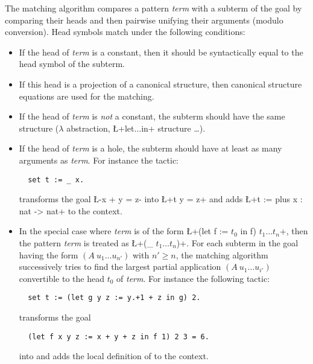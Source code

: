 The matching algorithm compares a pattern \textit{term}
 with a subterm of the goal by comparing their heads
and then pairwise unifying their arguments (modulo conversion). Head
symbols match under the following conditions:

\begin{itemize}
\item If the head of \textit{term} is a constant, then it
  should be syntactically equal to the head symbol of the subterm.
\item If this head is a projection of a canonical structure,
  then canonical structure equations are used for the matching.
\item If the head of \textit{term} is \emph{not} a constant, the
  subterm should have the same structure ($\lambda$ abstraction,
  \L+let$\dots$in+ structure \dots).
\item If the head of \textit{term} is a hole, the subterm should have
  at least as many arguments as  \textit{term}. For instance the tactic:
\begin{lstlisting}
  set t := _ x.
\end{lstlisting}
transforms the goal \L-x + y = z- into \L+t y = z+ and adds
\L+t := plus x : nat -> nat+ to the context.

\item In the special case where \textit{term} is of the form
\L+(let f := $t_0$ in f) $t_1\dots t_n$+,
 then the pattern \textit{term} is treated
as \L+(_ $t_1\dots t_n$)+. For each subterm in
the goal having the form $(A\  u_1\dots u_{n'})$ with $n' \geq n$, the
matching algorithm successively tries to find the largest
partial application $(A\ u_1\dots u_{i'})$ convertible to the head
$t_0$ of \textit{term}. For instance the following tactic:
\begin{lstlisting}
  set t := (let g y z := y.+1 + z in g) 2.
\end{lstlisting}
transforms the goal
\begin{lstlisting}
  (let f x y z := x + y + z in f 1) 2 3 = 6.
\end{lstlisting}
into  and adds the local definition of  to the
context.
\end{itemize}

